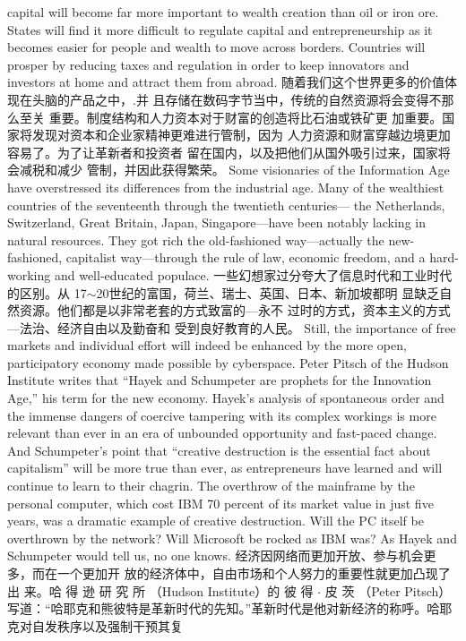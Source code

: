 \begin{paracol}{2}
capital will become far more important to wealth creation than
oil or iron ore. States will find it more difficult to regulate capital and entrepreneurship as it becomes easier for people and
wealth to move across borders. Countries will prosper by reducing taxes and regulation in order to keep innovators and investors at home and attract them from abroad.
\switchcolumn
随着我们这个世界更多的价值体现在头脑的产品之中，.并
且存储在数码字节当中，传统的自然资源将会变得不那么至关
重要。制度结构和人力资本对于财富的创造将比石油或铁矿更
加重要。国家将发现对资本和企业家精神更难进行管制，因为
人力资源和财富穿越边境更加容易了。为了让革新者和投资者
留在国内，以及把他们从国外吸引过来，国家将会减税和减少
管制，并因此获得繁荣。
\switchcolumn*
Some visionaries of the Information Age have overstressed its
differences from the industrial age. Many of the wealthiest
countries of the seventeenth through the twentieth centuries---
the Netherlands, Switzerland, Great Britain, Japan, Singapore---have been notably lacking in natural resources. They got
rich the old-fashioned way---actually the new-fashioned, capitalist way---through the rule of law, economic freedom, and a
hard-working and well-educated populace.
\switchcolumn
一些幻想家过分夸大了信息时代和工业时代的区别。从
17$\sim$20世纪的富国，荷兰、瑞士、英国、日本、新加坡都明
显缺乏自然资源。他们都是以非常老套的方式致富的---永不
过时的方式，资本主义的方式---法治、经济自由以及勤奋和
受到良好教育的人民。
\switchcolumn*
Still, the importance of free markets and individual effort
will indeed be enhanced by the more open, participatory economy made possible by cyberspace. Peter Pitsch of the Hudson Institute writes that ``Hayek and Schumpeter are prophets for
the Innovation Age,'' his term for the new economy. Hayek's
analysis of spontaneous order and the immense dangers of coercive tampering with its complex workings is more relevant than
ever in an era of unbounded opportunity and fast-paced
change. And Schumpeter's point that ``creative destruction is
the essential fact about capitalism'' will be more true than ever,
as entrepreneurs have learned and will continue to learn to their
chagrin. The overthrow of the mainframe by the personal computer, which cost IBM 70 percent of its market value in just five
years, was a dramatic example of creative destruction. Will the
PC itself be overthrown by the network? Will Microsoft be
rocked as IBM was? As Hayek and Schumpeter would tell us,
no one knows.
\switchcolumn
经济因网络而更加开放、参与机会更多，而在一个更加开
放的经济体中，自由市场和个人努力的重要性就更加凸现了出
来。哈 得 逊 研 究 所 （Hudson  Institute）的 彼 得 $\cdot$ 皮 茨 （Peter Pitsch）写道：“哈耶克和熊彼特是革新时代的先知。”革新时代是他对新经济的称呼。哈耶克对自发秩序以及强制干预其复

\end{paracol}
